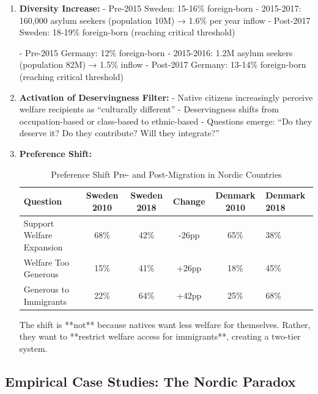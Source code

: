 \begin{enumerate}

\item \textbf{Diversity Increase:}
   - Pre-2015 Sweden: 15-16\% foreign-born
   - 2015-2017: 160,000 asylum seekers (population 10M) → 1.6\% per year inflow
   - Post-2017 Sweden: 18-19\% foreign-born (reaching critical threshold)

   - Pre-2015 Germany: 12\% foreign-born
   - 2015-2016: 1.2M asylum seekers (population 82M) → 1.5\% inflow
   - Post-2017 Germany: 13-14\% foreign-born (reaching critical threshold)

\item \textbf{Activation of Deservingness Filter:}
   - Native citizens increasingly perceive welfare recipients as ``culturally different''
   - Deservingness shifts from occupation-based or class-based to ethnic-based
   - Questions emerge: ``Do they deserve it? Do they contribute? Will they integrate?''

\item \textbf{Preference Shift:}

   \begin{table}[h]
   \centering
   \caption{Preference Shift Pre- and Post-Migration in Nordic Countries}
   \label{tab:migration-preferences}
   \begin{tabular}{lcccc}
   \toprule
   \textbf{Question} & \textbf{Sweden 2010} & \textbf{Sweden 2018} & \textbf{Change} & \textbf{Denmark 2010} & \textbf{Denmark 2018} \\
   \midrule
   Support Welfare Expansion & 68\% & 42\% & -26pp & 65\% & 38\% \\
   Welfare Too Generous & 15\% & 41\% & +26pp & 18\% & 45\% \\
   Generous to Immigrants & 22\% & 64\% & +42pp & 25\% & 68\% \\
   \bottomrule
   \end{tabular}
   \end{table}

   The shift is **not** because natives want less welfare for themselves. Rather, they want to **restrict welfare access for immigrants**, creating a two-tier system.

\end{enumerate}

\subsection{Empirical Case Studies: The Nordic Paradox}

